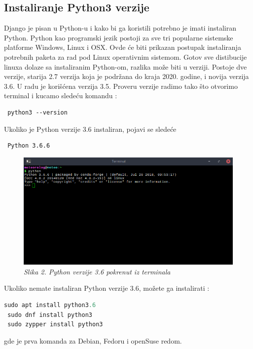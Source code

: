 \documentclass[12pt]{article}
\begin{document}
\subsection{Instaliranje Python3 verzije }
Django je pisan u Python-u i kako bi ga koristili potrebno je imati instaliran Python. Python kao programski jezik postoji za sve tri popularne sistemske platforme Windows, Linux i OSX. Ovde će biti prikazan postupak instaliranja potrebnih paketa za rad pod Linux operativnim sistemom. Gotov sve distibucije linuxa dolaze sa instaliranim Python-om, razlika može biti u verziji. Postoje dve verzije, starija 2.7 verzija koja je podržana do kraja 2020. godine, i novija verzija 3.6. U radu je korišćena verzija 3.5. Proveru verzije radimo tako što otvorimo terminal i kucamo sledeću komandu : 
\begin{lstlisting}
 python3 --version
\end{lstlisting}
Ukoliko je Python verzije 3.6 instaliran, pojavi se sledeće
\begin{lstlisting}
 Python 3.6.6
\end{lstlisting}
\begin{figure}[h!]
\centering
\includegraphics[width=0.8\linewidth]{python.png}
\caption*{\textsl{Slika 2. Python verzije 3.6 pokrenut iz terminala}}
\end{figure}
Ukoliko nemate instaliran Python verzije 3.6, možete ga instalirati :
\begin{lstlisting}[language=Python]
 sudo apt install python3.6
 sudo dnf install python3
 sudo zypper install python3
\end{lstlisting}
gde je prva komanda za Debian, Fedoru i openSuse redom.
\end{document}
